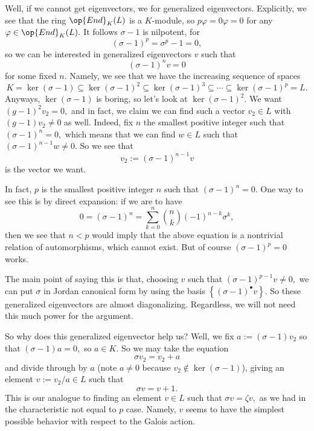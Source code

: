 Well, if we cannot get eigenvectors, we for generalized eigenvectors. Explicitly, we see that the ring $\op{End}_K(L)$ is a $K$-module, so $p\varphi=0\varphi=0$ for any $\varphi\in\op{End}_K(L).$ It follows $\sigma-1$ is nilpotent, for
\[(\sigma-1)^p=\sigma^p-1=0,\]
so we can be interested in generalized eigenvectors $v$ such that
\[(\sigma-1)^nv=0\]
for some fixed $n.$ Namely, we see that we have the increasing sequence of spaces
\[K=\ker(\sigma-1)\subseteq\ker(\sigma-1)^2\subseteq\ker(\sigma-1)^3\subseteq\cdots\subseteq\ker(\sigma-1)^p=L.\]
Anyways, $\ker(\sigma-1)$ is boring, so let's look at $\ker(\sigma-1)^2.$ We want $(g-1)^2v_2=0,$ and in fact, we claim we can find such a vector $v_2\in L$ with $(g-1)v_2\ne0$ as well. Indeed, fix $n$ the smallest positive integer such that $(\sigma-1)^n=0,$ which means that we can find $w\in L$ such that $(\sigma-1)^{n-1}w\ne0.$ So we see that
\[v_2:=(\sigma-1)^{n-1}v\]
is the vector we want.
\begin{remark}[Nir]
	In fact, $p$ is the smallest positive integer $n$ such that $(\sigma-1)^n=0.$ One way to see this is by direct expansion: if we are to have
	\[0=(\sigma-1)^n=\sum_{k=0}^n\binom nk(-1)^{n-k}\sigma^k,\]
	then we see that $n<p$ would imply that the above equation is a nontrivial relation of automorphisms, which cannot exist. But of course $(\sigma-1)^p=0$ works.
	
	The main point of saying this is that, choosing $v$ such that $(\sigma-1)^{p-1}v\ne0,$ we can put $\sigma$ in Jordan canonical form by using the basis $\left\{(\sigma-1)^\bullet v\right\}.$ So these generalized eigenvectors are almost diagonalizing. Regardless, we will not need this much power for the argument.
\end{remark}
So why does this generalized eigenvector help us? Well, we fix $a:=(\sigma-1)v_2$ so that $(\sigma-1)a=0,$ so $a\in K.$ So we may take the equation
\[\sigma v_2=v_2+a\]
and divide through by $a$ (note $a\ne0$ because $v_2\notin\ker(\sigma-1)$), giving an element $v:=v_2/a\in L$ such that
\[\sigma v=v+1.\]
This is our analogue to finding an element $v\in L$ such that $\sigma v=\zeta v,$ as we had in the characteristic not equal to $p$ case. Namely, $v$ seems to have the simplest possible behavior with respect to the Galois action.

